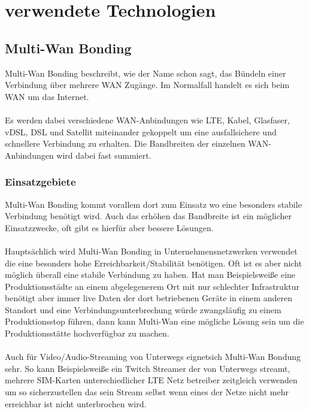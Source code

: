 \chapter{verwendete Technologien}
\label{chap:verwendeteTechnologien}
\section{Multi-Wan Bonding}
Multi-Wan Bonding beschreibt, wie der Name schon sagt, das Bündeln einer Verbindung über mehrere WAN Zugänge. Im Normalfall handelt es sich beim WAN um das Internet. 
\\\\
Es werden dabei verschiedene WAN-Anbindungen wie LTE, Kabel, Glasfaser, vDSL, DSL und Satellit miteinander gekoppelt um eine ausfallsichere und schnellere Verbindung zu erhalten. Die Bandbreiten der einzelnen WAN-Anbindungen wird dabei fast summiert. 

\subsection{Einsatzgebiete}
Multi-Wan Bonding kommt vorallem dort zum Einsatz wo eine besonders stabile Verbindung benötigt wird. Auch das erhöhen das Bandbreite ist ein möglicher Einsatzzwecke, oft gibt es hierfür aber bessere Lösungen.
\\\\
Hauptsächlich wird Multi-Wan Bonding in Unternehmensnetzwerken verwendet die eine besonders hohe Erreichbarkeit/Stabilität benötigen. Oft ist es aber nicht möglich überall eine stabile Verbindung zu haben. Hat man Beispielsweiße eine Produktionsstädte an einem abgelegenerem Ort mit nur schlechter Infrastruktur benötigt aber immer live Daten der dort betriebenen Geräte in einem anderen Standort und eine Verbindungsunterbrechung würde zwangsläufig zu einem Produktionsstop führen, dann kann Multi-Wan eine mögliche Lösung sein um die Produktionsstätte hochverfügbar zu machen.
\\\\
Auch für Video/Audio-Streaming von Unterwegs eignetsich Multi-Wan Bondung sehr. So kann Beispielsweiße ein Twitch Streamer der von Unterwegs streamt, mehrere SIM-Karten unterschiedlicher LTE Netz betreiber zeitgleich verwenden um so sicherzustellen das sein Stream selbst wenn eines der Netze nicht mehr erreichbar ist nicht unterbrochen wird.
 
